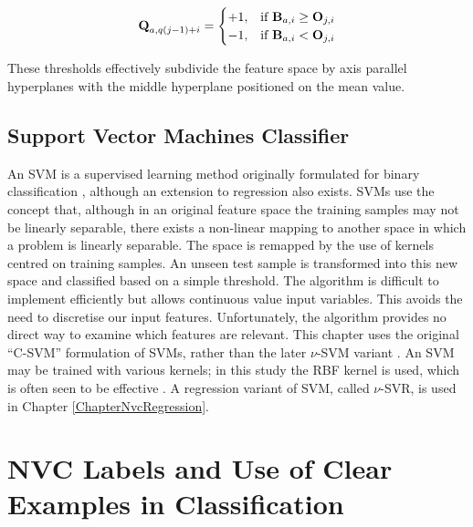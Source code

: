 \begin{gather}
\textbf{Q}_{a,q (j-1)+i} = \begin{cases}
+1, & \mbox{if } \textbf{B}_{a,i} \ge \textbf{O}_{j,i} \\ -1, & \mbox{if } \textbf{B}_{a,i} < \textbf{O}_{j,i}
\end{cases}
\end{gather}

%
%
These thresholds effectively subdivide the feature space by axis parallel hyperplanes with the middle hyperplane positioned on the mean value. %

\subsection{Support Vector Machines Classifier}
\label{SectionSupportVectorMachines}

An \ac{SVM} is a supervised learning method originally formulated for binary classification \cite{Cortes1995, Vapnik1998}, although an extension to regression \cite{Drucker1997} also exists. \ac{SVM}s use the concept that, although in an original feature space the training samples may not be linearly separable, there exists a non-linear mapping to another space in which a problem is linearly separable. The space is remapped by the use of kernels centred on training samples. An unseen test sample is transformed into this new space and classified based on a simple threshold. The algorithm is difficult to implement efficiently but allows continuous value input variables. This avoids the need to discretise our input features. Unfortunately, the algorithm provides no direct way to examine which features are relevant. This chapter uses the original ``C-SVM'' formulation of \ac{SVM}s, rather than the later $\nu$-SVM variant \cite{Scholkopf2000}. An \ac{SVM} may be trained with various kernels; in this study the \ac{RBF} kernel is used, which is often seen to be effective \cite{Shan2009}. A regression variant of \ac{SVM}, called $\nu$-SVR, is used in Chapter \ref{ChapterNvcRegression}.


\section{NVC Labels and Use of Clear Examples in Classification}
\label{SectionClearExamples}

